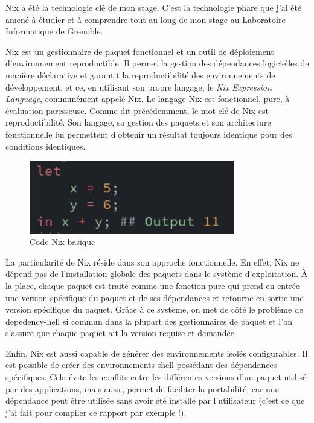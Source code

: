 \documentclass[a4paper,french,12pt, titlepage]{article}
\begin{document}
Nix a été la technologie clé de mon stage. C'est la technologie phare
que j'ai été amené à étudier et à comprendre tout au long de mon stage
au Laboratoire Informatique de Grenoble.\newline

Nix est un gestionnaire de paquet fonctionnel et un outil de déploiement
d'environnement reproductible. Il permet la gestion des dépendances
logicielles de manière déclarative et garantit la reproductibilité des
environnements de développement, et ce, en utilisant son propre langage,
le \emph{Nix Expression Language}, communément appelé Nix. Le langage
Nix est fonctionnel, pure, à évaluation paresseuse. Comme dit
précédemment, le mot clé de Nix est reproductibilité. Son langage, sa
gestion des paquets et son architecture fonctionnelle lui permettent
d'obtenir un résultat toujours identique pour des conditions
identiques.\newline

\begin{figure}[h]
\centering
\includegraphics[width=0.8\textwidth,height=0.8\textheight,keepaspectratio]{images/codebasenixdark.png}
\caption{Code Nix basique}
\end{figure}

La particularité de Nix réside dans son approche fonctionnelle. En
effet, Nix ne dépend pas de l'installation globale des paquets dans le
système d'exploitation. À la place, chaque paquet est traité comme une
fonction pure qui prend en entrée une version spécifique du paquet et de
ses dépendances et retourne en sortie une version spécifique du paquet.
Grâce à ce système, on met de côté le problème de \Gls{depedency-hell}
\cite{dll2018} si commun dans la plupart des gestionnaires de paquet et
l'on s'assure que chaque paquet ait la version requise et
demandée.\newline

Enfin, Nix est aussi capable de générer des environnements isolés
configurables. Il est possible de créer des environnements shell
possédant des dépendances spécifiques. Cela évite les conflits entre les
différentes versions d'un paquet utilisé par des applications, mais
aussi, permet de faciliter la portabilité, car une dépendance peut être
utilisée sans avoir été installé par l'utilisateur (c'est ce que j'ai
fait pour compiler ce rapport par exemple !).\newline
\end{document}

